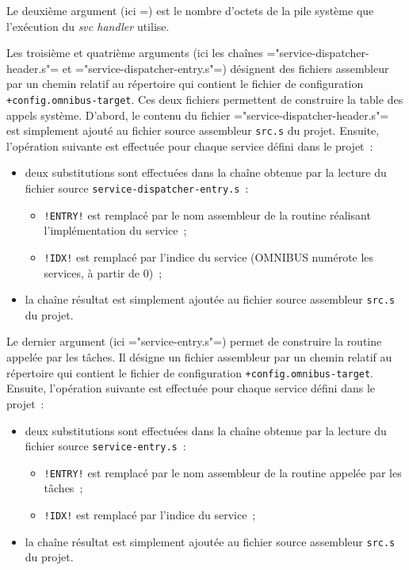 Le deuxième argument (ici =) est le nombre d'octets de la pile système que l'exécution du \emph{svc handler} utilise.

Les troisième et quatrième arguments (ici les chaînes \omnibus="service-dispatcher-header.s"= et \omnibus="service-dispatcher-entry.s"=) désignent des fichiers assembleur par un chemin relatif au répertoire qui contient le fichier de configuration \texttt{+config.omnibus-target}. Ces deux fichiers permettent de construire la table des appels système. D'abord, le contenu du fichier \omnibus="service-dispatcher-header.s"= est simplement ajouté au fichier source assembleur \texttt{src.s} du projet. Ensuite, l'opération suivante est effectuée pour chaque service défini dans le projet~:
\begin{itemize}
  \item deux substitutions sont effectuées dans la chaîne obtenue par la lecture du fichier source \texttt{service-dispatcher-entry.s}~:
  \begin{itemize}
    \item \texttt{!ENTRY!} est remplacé par le nom assembleur de la routine réalisant l'implémentation du service~;
    \item \texttt{!IDX!} est remplacé par l'indice du service (OMNIBUS numérote les services, à partir de $0$)~;
  \end{itemize}
  \item la chaîne résultat est simplement ajoutée au fichier source assembleur \texttt{src.s} du projet.
\end{itemize}

Le dernier argument (ici \omnibus="service-entry.s"=) permet de construire la routine appelée par les tâches. Il désigne un fichier assembleur par un chemin relatif au répertoire qui contient le fichier de configuration \texttt{+config.omnibus-target}. Ensuite, l'opération suivante est effectuée pour chaque service défini dans le projet~:
\begin{itemize}
  \item deux substitutions sont effectuées dans la chaîne obtenue par la lecture du fichier source \texttt{service-entry.s}~:
  \begin{itemize}
    \item \texttt{!ENTRY!} est remplacé par le nom assembleur de la routine appelée par les tâches~;
    \item \texttt{!IDX!} est remplacé par l'indice du service~;
  \end{itemize}
  \item la chaîne résultat est simplement ajoutée au fichier source assembleur \texttt{src.s} du projet.
\end{itemize}











